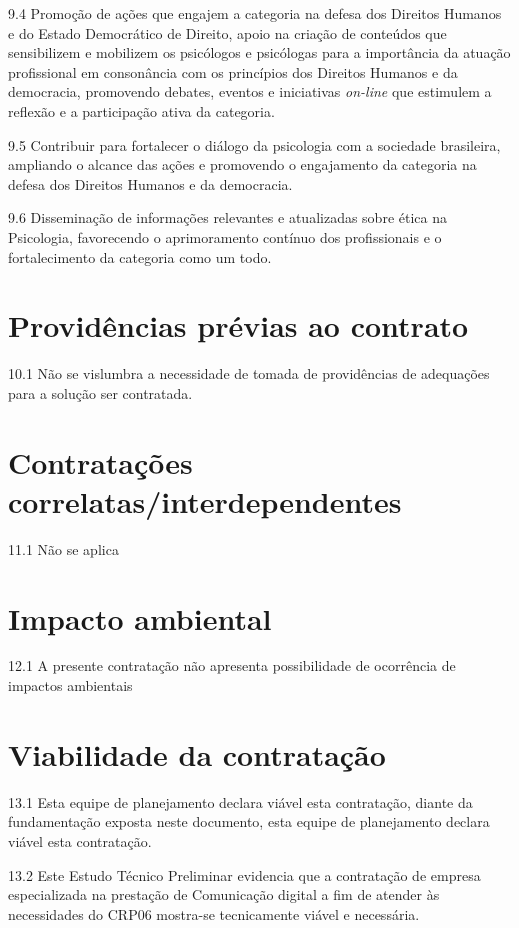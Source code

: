 \documentclass[oneside,a4paper,article]{memoir}
\begin{document}
9.4 Promoção de ações que engajem a categoria na defesa dos Direitos
Humanos e do Estado Democrático de Direito, apoio na criação de
conteúdos que sensibilizem e mobilizem os psicólogos e psicólogas para a
importância da atuação profissional em consonância com os princípios dos
Direitos Humanos e da democracia, promovendo debates, eventos e
iniciativas  \textit{on-line} que estimulem a reflexão e a participação ativa da
categoria.

9.5 Contribuir para fortalecer o diálogo da psicologia com a sociedade
brasileira, ampliando o alcance das ações e promovendo o engajamento da
categoria na defesa dos Direitos Humanos e da democracia.

9.6 Disseminação de informações relevantes e atualizadas sobre ética na
Psicologia, favorecendo o aprimoramento contínuo dos profissionais e o
fortalecimento da categoria como um todo.

\chapter{Providências prévias ao contrato}

10.1 Não se vislumbra a necessidade de tomada de providências de
adequações para a solução ser contratada.

\chapter{Contratações correlatas/interdependentes}

11.1 Não se aplica

\chapter{Impacto ambiental}

12.1 A presente contratação não apresenta possibilidade de ocorrência de
impactos ambientais

\chapter{Viabilidade da contratação}

13.1 Esta equipe de planejamento declara viável esta contratação, diante
da fundamentação exposta neste documento, esta equipe de planejamento
declara viável esta contratação.

13.2 Este Estudo Técnico Preliminar evidencia que a contratação de
empresa especializada na prestação de Comunicação digital a fim de
atender às necessidades do CRP06 mostra-se tecnicamente viável e
necessária.
\end{document}
